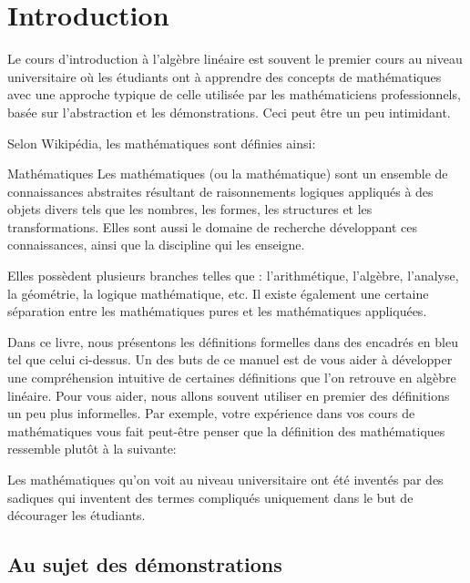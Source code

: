 \chapter{Introduction}
Le cours d'introduction à l'algèbre linéaire est souvent
le premier cours au niveau universitaire où les étudiants ont à apprendre des concepts de mathématiques avec une approche
typique de celle utilisée par les mathématiciens professionnels, basée sur l'abstraction et les démonstrations.  Ceci peut être un peu intimidant.

Selon Wikipédia, les mathématiques sont définies ainsi:

\begin{TrueDef}{Mathématiques}
Les mathématiques (ou la mathématique) sont un ensemble de connaissances abstraites résultant de raisonnements logiques appliqués à des objets divers tels que les nombres, les formes, les structures et les transformations. Elles sont aussi le domaine de recherche développant ces connaissances, ainsi que la discipline qui les enseigne.

Elles possèdent plusieurs branches telles que : l'arithmétique, l'algèbre, l'analyse, la géométrie, la logique mathématique, etc. Il existe également une certaine séparation entre les mathématiques pures et les mathématiques appliquées.
\end{TrueDef}

Dans ce livre, nous présentons les définitions formelles
dans des encadrés en bleu tel que celui ci-dessus. 
Un des buts de ce manuel est de vous aider à développer
une compréhension intuitive de certaines définitions
que l'on retrouve en algèbre linéaire.
Pour vous aider, nous allons souvent utiliser en premier
des définitions un peu plus informelles.  Par exemple, votre expérience dans vos cours de mathématiques vous fait
peut-être penser que la définition des mathématiques ressemble plutôt à la suivante:

\begin{NotDef}
Les mathématiques qu'on voit au niveau universitaire
ont été inventés par des sadiques qui inventent des
termes compliqués uniquement dans le but de décourager les étudiants.
\end{NotDef}



\section{Au sujet des démonstrations}

